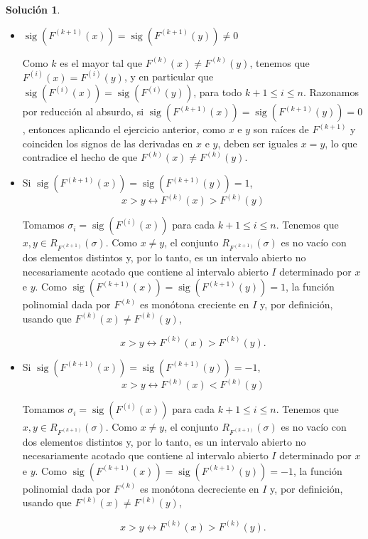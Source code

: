 \documentclass[10pt]{article}
\theoremstyle{definition}
\newtheorem*{sol}{Solución}
\newcommand{\sig}{\operatorname{sig}}
\begin{document}
\begin{sol}\leavevmode

\begin{itemize}
    \item $\sig(F^{(k+1)}(x))=\sig(F^{(k+1)}(y))\neq 0$
    
    Como $k$ es el mayor tal que $F^{(k)}(x)\neq F^{(k)}(y)$, tenemos que $F^{(i)}(x)=F^{(i)}(y)$, y en particular que $\sig(F^{(i)}(x))=\sig(F^{(i)}(y))$, para todo $k+1\leq i\leq n$. Razonamos por reducción al absurdo, si $\sig(F^{(k+1)}(x))=\sig(F^{(k+1)}(y))=0$, entonces aplicando el ejercicio anterior, como $x$ e $y$ son raíces de $F^{(k+1)}$ y coinciden los signos de las derivadas en $x$ e $y$, deben ser iguales $x=y$, lo que contradice el hecho de que $F^{(k)}(x)\neq F^{(k)}(y)$.
    \item Si $\sig(F^{(k+1)}(x))=\sig(F^{(k+1)}(y))=1$,
    \[x>y\leftrightarrow F^{(k)}(x)>F^{(k)}(y)\]
    
    Tomamos $\sigma_i=\sig(F^{(i)}(x))$ para cada $k+1\leq i\leq n$. Tenemos que $x,y\in R_{F^{(k+1)}}(\sigma)$. Como $x\neq y$, el conjunto $R_{F^{(k+1)}}(\sigma)$ es no vacío con dos elementos distintos y, por lo tanto, es un intervalo abierto no necesariamente acotado que contiene al intervalo abierto $I$ determinado por $x$ e $y$. Como $\sig(F^{(k+1)}(x))=\sig(F^{(k+1)}(y))=1$, la función polinomial dada por $F^{(k)}$ es monótona creciente en $I$ y, por definición, usando que $F^{(k)}(x)\neq F^{(k)}(y)$,
    
    \[x>y \leftrightarrow F^{(k)}(x)>F^{(k)}(y).\]

    \item Si $\sig(F^{(k+1)}(x))=\sig(F^{(k+1)}(y))=-1$,
    \[x>y\leftrightarrow F^{(k)}(x)<F^{(k)}(y)\]
    
    Tomamos $\sigma_i=\sig(F^{(i)}(x))$ para cada $k+1\leq i\leq n$. Tenemos que $x,y\in R_{F^{(k+1)}}(\sigma)$. Como $x\neq y$, el conjunto $R_{F^{(k+1)}}(\sigma)$ es no vacío con dos elementos distintos y, por lo tanto, es un intervalo abierto no necesariamente acotado que contiene al intervalo abierto $I$ determinado por $x$ e $y$. Como $\sig(F^{(k+1)}(x))=\sig(F^{(k+1)}(y))=-1$, la función polinomial dada por $F^{(k)}$ es monótona decreciente en $I$ y, por definición, usando que $F^{(k)}(x)\neq F^{(k)}(y)$,
    
    \[x>y \leftrightarrow F^{(k)}(x)>F^{(k)}(y).\]
    
    
\end{itemize}
\end{sol}
\end{document}
